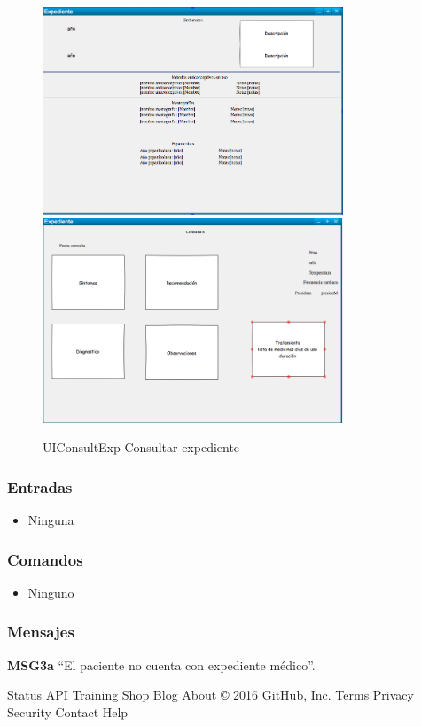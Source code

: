 \begin{figure}[htbp!]
        \centering
        \includegraphics[width=0.8\textwidth]{images/UIEXP3}
            \includegraphics[width=0.8\textwidth]{images/UIEXP4}
        \caption{UIConsultExp Consultar expediente}
\end{figure}
\newpage
\subsubsection{Entradas}
\begin{itemize}
\item Ninguna
\end{itemize}

\subsubsection{Comandos}
\begin{itemize}
\item Ninguno
\end{itemize}

\subsubsection{Mensajes}
    \begin{Citemize}
        \item {\bf MSG3a} ``El paciente no cuenta con expediente médico''.
    \end{Citemize}






Status API Training Shop Blog About
© 2016 GitHub, Inc. Terms Privacy Security Contact Help
